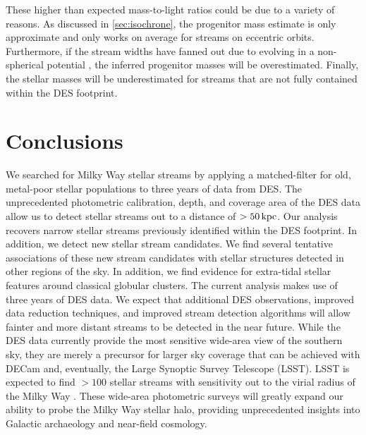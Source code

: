 \documentclass[twocolumn]{aastex61}
\begin{document}
These higher than expected mass-to-light ratios could be due to a variety of reasons. As discussed in \ref{sec:isochrone}, the progenitor mass estimate is only approximate and only works on average for streams on eccentric orbits. Furthermore, if the stream widths have fanned out due to evolving in a non-spherical potential \citep[e.g.][]{Erkal:2016}, the inferred progenitor masses will be overestimated. Finally, the stellar masses will be underestimated for streams that are not fully contained within the DES footprint. 

\section{Conclusions}
\label{sec:conclusions}

We searched for Milky Way stellar streams by applying a matched-filter for old, metal-poor stellar populations to three years of data from DES.
The unprecedented photometric calibration, depth, and coverage area of the DES data allow us to detect stellar streams out to a distance of $> 50 \mathrm{\,kpc}$.
Our analysis recovers \NKNOWN narrow stellar streams previously identified within the DES footprint. 
In addition, we detect \NSTREAMS new stellar stream candidates.
We find several tentative associations of these new stream candidates with stellar structures detected in other regions of the sky.
In addition, we find evidence for extra-tidal stellar features around \NGLOB classical globular clusters.
The current analysis makes use of three years of DES data. 
We expect that additional DES observations, improved data reduction techniques, and improved stream detection algorithms will allow fainter and more distant streams to be detected in the near future.
While the DES data currently provide the most sensitive wide-area view of the southern sky, they are merely a precursor for larger sky coverage that can be achieved with DECam and, eventually, the Large Synoptic Survey Telescope (LSST).
LSST is expected to find $>100$ stellar streams with sensitivity out to the virial radius of the Milky Way \citep{LSST:2009}.
These wide-area photometric surveys will greatly expand our ability to probe the Milky Way stellar halo, providing unprecedented insights into Galactic archaeology and near-field cosmology.
\end{document}
